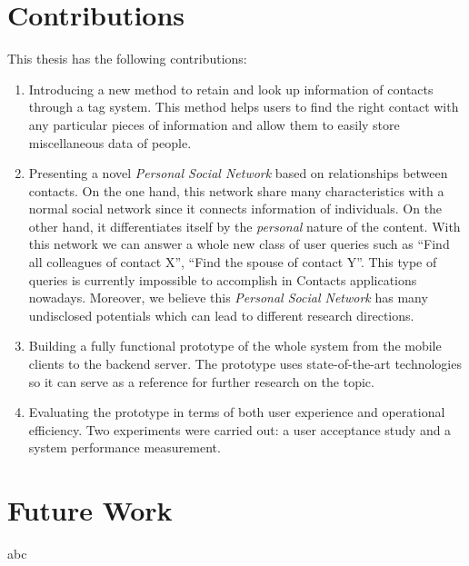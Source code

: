 \section{Contributions}
This thesis has the following contributions:

\begin{enumerate}
    \item Introducing a new method to retain and look up information of contacts through a tag system. This method helps users to find the right contact with any particular pieces of information and allow them to easily store miscellaneous data of people.
    \item Presenting a novel \textit{Personal Social Network} based on relationships between contacts. On the one hand, this network share many characteristics with a normal social network since it connects information of individuals. On the other hand, it differentiates itself by the \textit{personal} nature of the content. With this network we can answer a whole new class of user queries such as ``Find all colleagues of contact X'', ``Find the spouse of contact Y''. This type of queries is currently impossible to accomplish in Contacts applications nowadays. Moreover, we believe this \textit{Personal Social Network} has many undisclosed potentials which can lead to different research directions.
    \item Building a fully functional prototype of the whole system from the mobile clients to the backend server. The prototype uses state-of-the-art technologies so it can serve as a reference for further research on the topic.
    \item Evaluating the prototype in terms of both user experience and operational efficiency. Two experiments were carried out: a user acceptance study and a system performance measurement.
\end{enumerate}

\section{Future Work}
abc


